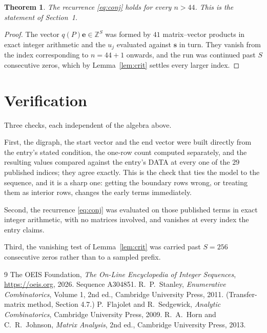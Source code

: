 \documentclass[11pt,a4paper]{article}
\theoremstyle{plain}
\newtheorem{theorem}{Theorem}
\theoremstyle{definition}
\begin{document}
\begin{theorem}
The recurrence \eqref{eq:conj} holds for every $n>44$. This is the statement of
Section~1.
\end{theorem}

\begin{proof}
The vector $q(P)\mathbf{e}\in\mathbb{Z}^{S}$ was formed by $41$ matrix--vector
products in exact integer arithmetic and the $u_j$ evaluated against $\mathbf{s}$ in turn.
They vanish from the index corresponding to $n=44+1$ onwards, and the run was continued
past $S$ consecutive zeros, which by Lemma~\ref{lem:crit} settles every larger index.
\end{proof}

\section{Verification}

Three checks, each independent of the algebra above.

First, the digraph, the start vector and the end vector were built directly from the
entry's stated condition, the one-row count computed separately, and the resulting values
compared against the entry's DATA at every one of the $29$ published indices; they
agree exactly. This is the check that ties the model to the sequence, and it is a sharp one:
getting the boundary rows wrong, or treating them as interior rows, changes the early terms
immediately.

Second, the recurrence \eqref{eq:conj} was evaluated on those published terms in exact
integer arithmetic, with no matrices involved, and vanishes at every index the entry claims.

Third, the vanishing test of Lemma~\ref{lem:crit} was carried past $S=256$ consecutive
zeros rather than to a sampled prefix.

\begin{thebibliography}{9}
 The OEIS Foundation, \emph{The On-Line Encyclopedia of Integer
Sequences}, \url{https://oeis.org}, 2026. Sequence A304851.
 R.~P.~Stanley, \emph{Enumerative Combinatorics}, Volume 1, 2nd ed.,
Cambridge University Press, 2011. (Transfer-matrix method, Section 4.7.)
 P.~Flajolet and R.~Sedgewick, \emph{Analytic Combinatorics}, Cambridge
University Press, 2009.
 R.~A.~Horn and C.~R.~Johnson, \emph{Matrix Analysis}, 2nd ed., Cambridge
University Press, 2013.
\end{thebibliography}
\end{document}
